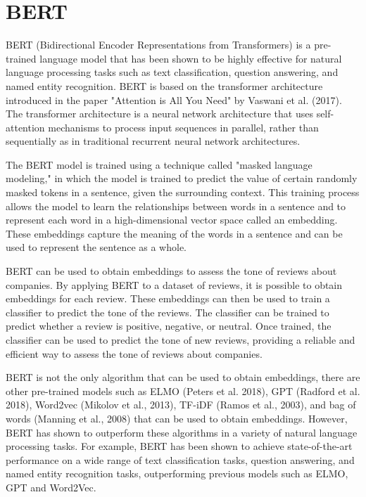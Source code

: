 \documentclass[PI]{ProjectProposal}
\begin{document}
\section{BERT}
\label{sec:org0abc6b0}
BERT (Bidirectional Encoder Representations from Transformers) is a pre-trained language model that has been shown to be highly effective for natural language processing tasks such as text classification, question answering, and named entity recognition. BERT is based on the transformer architecture introduced in the paper "Attention is All You Need" by Vaswani et al. (2017). The transformer architecture is a neural network architecture that uses self-attention mechanisms to process input sequences in parallel, rather than sequentially as in traditional recurrent neural network architectures.

The BERT model is trained using a technique called "masked language modeling," in which the model is trained to predict the value of certain randomly masked tokens in a sentence, given the surrounding context. This training process allows the model to learn the relationships between words in a sentence and to represent each word in a high-dimensional vector space called an embedding. These embeddings capture the meaning of the words in a sentence and can be used to represent the sentence as a whole.

BERT can be used to obtain embeddings to assess the tone of reviews about companies. By applying BERT to a dataset of reviews, it is possible to obtain embeddings for each review. These embeddings can then be used to train a classifier to predict the tone of the reviews. The classifier can be trained to predict whether a review is positive, negative, or neutral. Once trained, the classifier can be used to predict the tone of new reviews, providing a reliable and efficient way to assess the tone of reviews about companies.

BERT is not the only algorithm that can be used to obtain embeddings, there are other pre-trained models such as ELMO (Peters et al. 2018), GPT (Radford et al. 2018), Word2vec (Mikolov et al., 2013), TF-iDF (Ramos et al., 2003), and bag of words (Manning et al., 2008) that can be used to obtain embeddings. However, BERT has shown to outperform these algorithms in a variety of natural language processing tasks. For example, BERT has been shown to achieve state-of-the-art performance on a wide range of text classification tasks, question answering, and named entity recognition tasks, outperforming previous models such as ELMO, GPT and Word2Vec.
\end{document}
